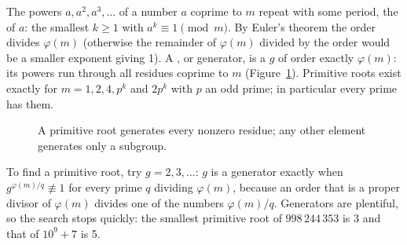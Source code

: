 The powers $a, a^2, a^3, \dots$ of a number $a$ coprime to $m$ repeat with some period, the  of $a$: the smallest $k \ge 1$
with $a^k \equiv 1 \pmod m$. By Euler's theorem the order divides $\varphi(m)$ (otherwise the remainder of $\varphi(m)$ divided by
the order would be a smaller exponent giving 1). A , or generator, is a $g$ of order exactly $\varphi(m)$: its powers
run through all residues coprime to $m$ (Figure~\ref{fig:primroot}). Primitive roots exist exactly for $m = 1, 2, 4, p^k$ and $2p^k$
with $p$ an odd prime; in particular every prime has them.

\begin{figure}[htbp]
\centering
{}
\caption{A primitive root generates every nonzero residue; any other element generates only a subgroup.}
\label{fig:primroot}
\end{figure}

To find a primitive root, try $g = 2, 3, \dots$: $g$ is a generator exactly when $g^{\varphi(m)/q} \not\equiv 1$ for every prime $q$
dividing $\varphi(m)$, because an order that is a proper divisor of $\varphi(m)$ divides one of the numbers $\varphi(m)/q$. Generators
are plentiful, so the search stops quickly: the smallest primitive root of $998\,244\,353$ is 3 and that of $10^9 + 7$ is 5.


